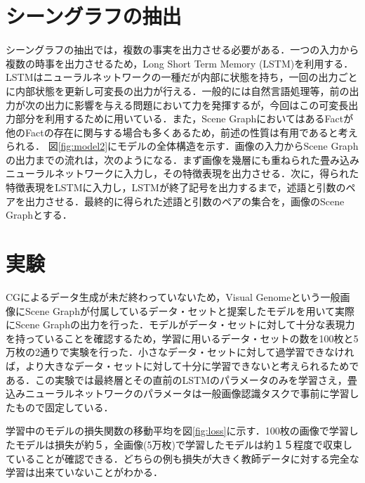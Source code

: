 \section{シーングラフの抽出}
シーングラフの抽出では，複数の事実を出力させる必要がある．一つの入力から複数の時事を出力させるため，Long Short Term Memory (LSTM)\cite{lstm}を利用する．LSTMはニューラルネットワークの一種だが内部に状態を持ち，一回の出力ごとに内部状態を更新し可変長の出力が行える．一般的には自然言語処理等，前の出力が次の出力に影響を与える問題において力を発揮するが，今回はこの可変長出力部分を利用するために用いている．また，Scene GraphにおいてはあるFactが他のFactの存在に関与する場合も多くあるため，前述の性質は有用であると考えられる．
図\ref{fig:model2}にモデルの全体構造を示す．画像の入力からScene Graphの出力までの流れは，次のようになる．まず画像を幾層にも重ねられた畳み込みニューラルネットワークに入力し，その特徴表現を出力させる．次に，得られた特徴表現をLSTMに入力し，LSTMが終了記号を出力するまで，述語と引数のペアを出力させる．最終的に得られた述語と引数のペアの集合を，画像のScene Graphとする．

\section{実験}
CGによるデータ生成が未だ終わっていないため，Visual Genome\cite{visual_genome}という一般画像にScene Graphが付属しているデータ・セットと提案したモデルを用いて実際にScene Graphの出力を行った．モデルがデータ・セットに対して十分な表現力を持っていることを確認するため，学習に用いるデータ・セットの数を100枚と5万枚の2通りで実験を行った．小さなデータ・セットに対して過学習できなければ，より大きなデータ・セットに対して十分に学習できないと考えられるためである．この実験では最終層とその直前のLSTMのパラメータのみを学習さえ，畳込みニューラルネットワークのパラメータは一般画像認識タスクで事前に学習したもので固定している．

学習中のモデルの損失関数の移動平均を図\ref{fig:loss}に示す．100枚の画像で学習したモデルは損失が約５，全画像(5万枚)で学習したモデルは約１５程度で収束していることが確認できる．どちらの例も損失が大きく教師データに対する完全な学習は出来ていないことがわかる．

